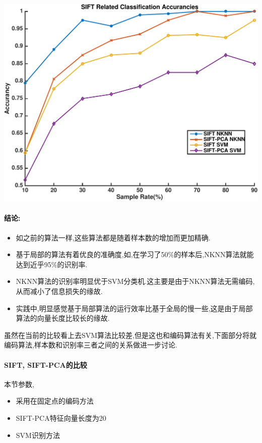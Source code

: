 		\begin{center}
		\begin{minipage}[t]{\linewidth}
		\center
		{
		\includegraphics[width=\MyFactor\textwidth]{Img/c3/sift_classification} 
		}
		\end{minipage}
		\medskip
		\end{center}
		
\paragraph{结论:}
\begin{itemize}
	\item 如之前的算法一样,这些算法都是随着样本数的增加而更加精确.
	\item 基于局部的算法有着优良的准确度,如,在学习了50\%的样本后,NKNN算法就能达到近乎95\%的识别率.
	\item NKNN算法的识别率明显优于SVM分类机.这主要是由于NKNN算法无需编码,从而减小了信息损失的缘故.
	\item 实践中,明显感觉基于局部算法的运行效率比基于全局的慢一些,这是由于局部算法的向量长度比较长的缘故.
\end{itemize}

虽然在当前的比较看上去SVM算法比较差,但是这也和编码算法有关,下面部分将就编码算法,样本数和识别率三者之间的关系做进一步讨论.

\paragraph{SIFT, SIFT-PCA的比较}本节参数,
\begin{itemize}
	\item 采用在固定点的编码方法
	\item SIFT-PCA特征向量长度为20
	\item SVM识别方法
\end{itemize}

